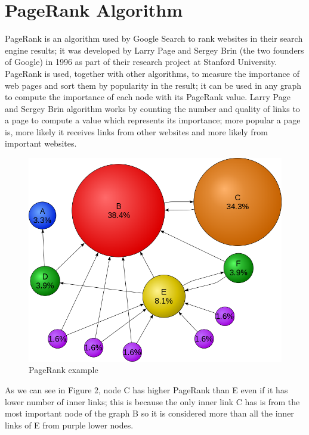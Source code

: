 \documentclass[12 pt]{article}
\begin{document}
\section{PageRank Algorithm}
PageRank is an algorithm used by Google Search to rank websites in their search engine results; it was developed by  Larry Page and  Sergey Brin (the two founders of Google) in 1996 as part of their research project at Stanford University. \\
PageRank is used, together with other algorithms, to measure the importance of web pages and sort them by popularity in the result; it can be used in any graph to compute the importance of each node with its PageRank value. Larry Page and  Sergey Brin algorithm works by counting the number and quality of links to a page to compute a value which represents its importance; more popular a page is, more likely it receives links from other websites and more likely from important websites.\\
\begin{figure}[h!]
\begin{center}
\includegraphics[scale=0.3]{./img/page_rank_example.png}
\caption{PageRank example}
\end{center}
\end{figure}
As we can see in Figure 2, node C has higher PageRank than E even if it has lower number of inner links; this is because the only inner link C has is from the most important node of the graph B so it is considered more than all the inner links of E from purple lower nodes.
\end{document}
